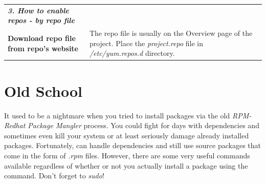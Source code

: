 \begin{table}[!htpb]
\begin{tabular}{|>{\bfseries}l p{6cm}|}
\textit{\color{red}3. How to enable repos - by repo file} & \\[2mm]
Download repo file from repo's website & The repo file is usually on the Overview page of the project. Place the \textsl{project.repo} file in \textsl{/etc/yum.repos.d} directory.\\[3mm]	
\hline
\end{tabular}
\end{table}

\section{Old School}

It used to be a nightmare when you tried to install packages via the old \emph{RPM-Redhat Package Mangler} process. You could fight for days with dependencies and sometimes even kill your system or at least seriously damage already installed packages. Fortunately,  can handle dependencies and still use source packages that come in the form of \textsl{.rpm} files. However, there are some very useful  commands available regardless of whether or not you actually install a package using the  command. Don't forget to \emph{sudo}!

